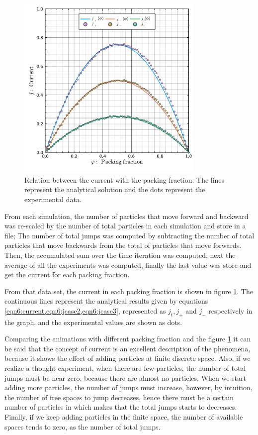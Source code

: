 \documentclass[main.tex]{subfiles}
\begin{document}
\begin{figure}[ht!]
    \centering
    \includegraphics[width=0.8\textwidth]{imgs/hw6/current_packingfraction.pdf}
    \caption{
        Relation between the current with the packing fraction.
        The lines represent the analytical solution and the dots represent the experimental data.
    }
    \label{fig6:asep_jp}
\end{figure}

From each simulation, the number of particles that move forward and backward was re-scaled by the number of total particles in each simulation and store in a file;
The number of total jumps was computed by subtracting the number of total particles that move backwards from the total of particles that move forwards.
Then, the accumulated sum over the time iteration was computed, next the average of all the experiments was computed, finally the last value was store and get the current for each packing fraction.

From that data set, the current in each packing fraction is shown in figure \ref{fig6:asep_jp}.
The continuous lines represent the analytical results given by equations \cref{eqn6:current,eqn6:jcase2,eqn6:jcase3}, represented as $j_t,j_+$ and $j_-$ respectively in the graph, and the experimental values are shown as dots.

Comparing the animations with different packing fraction and the figure \ref{fig6:asep_jp} it can be said that the concept of current is an excellent description of the phenomena, because it shows the effect of adding particles at finite discrete space.
Also, if we realize a thought experiment, when there are few particles, the number of total jumps must be near zero, because there are almost no particles.
When we start adding more particles, the number of jumps must increase, however, by intuition, the number of free spaces to jump decreases, hence there must be a certain number of particles in which makes that the total jumps starts to decreases.
Finally, if we keep adding particles in the finite space, the number of available spaces tends to zero, as the number of total jumps. 
\end{document}
